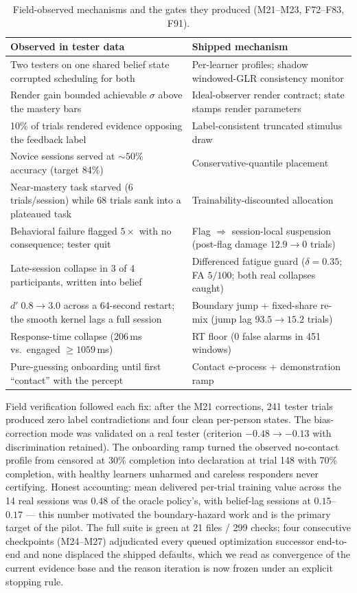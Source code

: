 \documentclass[11pt]{article}
\begin{document}
\begin{table}[h]
\centering\small
\begin{tabular}{p{}p{}}
\toprule
\textbf{Observed in tester data} & \textbf{Shipped mechanism} \\
\midrule
Two testers on one shared belief state corrupted scheduling for both &
Per-learner profiles; shadow windowed-GLR consistency monitor \\
Render gain bounded achievable $\sigma$ above the mastery bars &
Ideal-observer render contract; state stamps render parameters \\
10\% of trials rendered evidence opposing the feedback label &
Label-consistent truncated stimulus draw \\
Novice sessions served at ${\sim}50\%$ accuracy (target 84\%) &
Conservative-quantile placement \\
Near-mastery task starved (6 trials/session) while 68 trials sank into a
plateaued task & Trainability-discounted allocation \\
Behavioral failure flagged $5\times$ with no consequence; tester quit &
Flag $\Rightarrow$ session-local suspension (post-flag damage $12.9 \to 0$
trials) \\
Late-session collapse in 3 of 4 participants, written into belief &
Differenced fatigue guard ($\delta = 0.35$; FA $5/100$; both real collapses
caught) \\
$d' \; 0.8 \to 3.0$ across a 64-second restart; the smooth kernel lags a full
session & Boundary jump + fixed-share re-mix (jump lag $93.5 \to 15.2$ trials) \\
Response-time collapse (206\,ms vs.\ engaged $\ge 1059$\,ms) &
RT floor (0 false alarms in 451 windows) \\
Pure-guessing onboarding until first ``contact'' with the percept &
Contact e-process + demonstration ramp \\
\bottomrule
\end{tabular}
\caption{Field-observed mechanisms and the gates they produced (M21--M23, F72--F83, F91).}
\label{tab:gates}
\end{table}

Field verification followed each fix: after the M21 corrections, 241 tester
trials produced zero label contradictions and four clean per-person states. The
bias-correction mode was validated on a real tester (criterion
$-0.48 \to -0.13$ with discrimination retained). The onboarding ramp turned the
observed no-contact profile from censored at 30\% completion into declaration at
trial 148 with 70\% completion, with healthy learners unharmed and careless
responders never certifying. Honest accounting: mean delivered per-trial
training value across the 14 real sessions was $0.48$ of the oracle policy's,
with belief-lag sessions at $0.15$--$0.17$ --- this number motivated the
boundary-hazard work and is the primary target of the pilot. The full suite is
green at 21 files / 299 checks; four consecutive checkpoints (M24--M27)
adjudicated every queued optimization successor end-to-end and none displaced
the shipped defaults, which we read as convergence of the current evidence base
and the reason iteration is now frozen under an explicit stopping rule.
\end{document}
